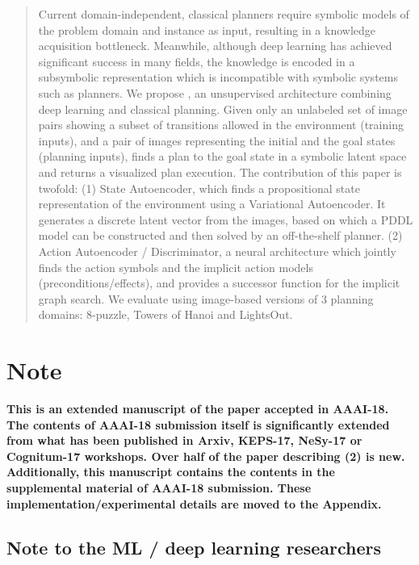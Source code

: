 \documentclass[11pt]{article}
\begin{document}
\begin{abstract}
Current domain-independent, classical planners require symbolic models of the problem domain and instance as input, resulting in a knowledge acquisition bottleneck.
Meanwhile, although deep learning has achieved significant success in many fields, the knowledge is encoded in a subsymbolic representation which is incompatible with symbolic systems such as planners.
We propose \latentplanner, an unsupervised architecture combining deep learning and classical planning.
% 
Given only an unlabeled set of image pairs showing a subset of transitions allowed in the environment (training inputs),
and a pair of images representing the initial and the goal states (planning inputs),
\latentplanner finds a plan to the goal state in a symbolic latent space and returns a visualized plan execution.
The contribution of this paper is twofold:
(1) State Autoencoder, which finds a propositional state representation of the environment using a Variational Autoencoder.
It generates a discrete latent vector from the images, based on which a PDDL model can be constructed and then solved by an off-the-shelf planner.
(2) Action Autoencoder / Discriminator, a neural architecture which jointly finds the action symbols and the implicit action models (preconditions/effects),
and provides a successor function for the implicit graph search.
We evaluate \latentplanner using image-based versions of 3 planning domains: 8-puzzle, Towers of Hanoi and LightsOut.
\end{abstract}


\section*{Note}

\textbf{This is an extended manuscript of the paper accepted in AAAI-18.
The contents of AAAI-18 submission itself is significantly extended from what has been published in
Arxiv, KEPS-17, NeSy-17 or Cognitum-17 workshops.
Over half of the paper describing (2) is new.
Additionally, this manuscript contains the contents in the supplemental material of AAAI-18 submission.
These implementation/experimental details are moved to the Appendix.
}

\subsection*{Note to the ML / deep learning researchers}
\end{document}
